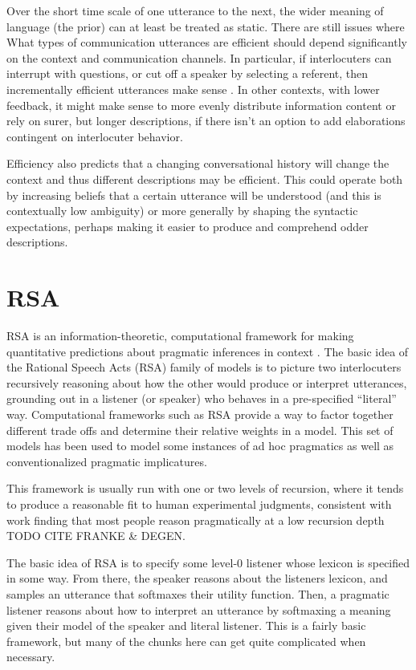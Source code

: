 \documentclass[]{article}
\begin{document}
Over the short time scale of one utterance to the next, the wider meaning of language (the prior) can at least be treated as static. There are still issues where What types of communication utterances are efficient should depend significantly on the context and communication channels. In particular, if interlocuters can interrupt with questions, or cut off a speaker by selecting a referent, then incrementally efficient utterances make sense \cite{gibson2019}. In other contexts, with lower feedback, it might make sense to more evenly distribute information content or rely on surer, but longer descriptions, if there isn't an option to add elaborations contingent on interlocuter behavior.

Efficiency also predicts that a changing conversational history will change the context and thus different descriptions may be efficient. This could operate both by increasing beliefs that a certain utterance will be understood (and this is contextually low ambiguity) or more generally by shaping the syntactic expectations, perhaps making it easier to produce and comprehend odder descriptions. 

\section{RSA}

RSA is an information-theoretic, computational framework for making quantitative predictions about pragmatic inferences in context \cite{goodman2016, frank2012a}. The basic idea of the Rational Speech Acts (RSA) family of models is to picture two interlocuters recursively reasoning about how the other would produce or interpret utterances, grounding out in a listener (or speaker) who behaves in a pre-specified ``literal'' way. Computational frameworks such as RSA provide a way to factor together different trade offs and determine their relative weights in a model. This set of models has been used to model some instances of ad hoc pragmatics as well as conventionalized pragmatic implicatures. 

This framework is usually run with one or two levels of recursion, where it tends to produce a reasonable fit to human experimental judgments, consistent with work finding that most people reason pragmatically at a low recursion depth TODO CITE FRANKE \& DEGEN. 

The basic idea of RSA is to specify some level-0 listener whose lexicon is specified in some way. From there, the speaker reasons about the listeners lexicon, and samples an utterance that softmaxes their utility function. Then, a pragmatic listener reasons about how to interpret an utterance by softmaxing a meaning given their model of the speaker and literal listener. This is a fairly basic framework, but many of the chunks here can get quite complicated when necessary. 
\end{document}
